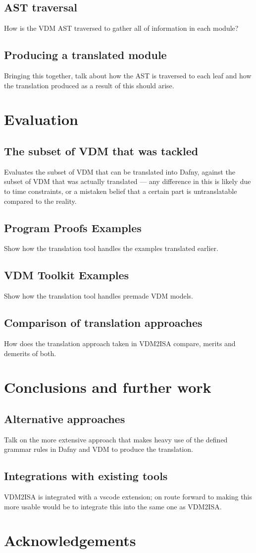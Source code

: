 \documentclass{entcs}
\begin{document}
\subsection{AST traversal}
How is the VDM AST traversed to gather all of information in each module?

\subsection{Producing a translated module}
Bringing this together, talk about how the AST is traversed to each leaf and how the translation produced as a result of this should arise.

\section{Evaluation}
\subsection{The subset of VDM that was tackled}
Evaluates the subset of VDM that can be translated into Dafny, against the subset of VDM that was actually translated --- any difference in this is likely due to time constraints, or a mistaken belief that a certain part is untranslatable compared to the reality.

\subsection{Program Proofs Examples}
Show how the translation tool handles the examples translated earlier.

\subsection{VDM Toolkit Examples}
Show how the translation tool handles premade VDM models.

\subsection{Comparison of translation approaches}
How does the translation approach taken in VDM2ISA compare, merits and demerits of both.

\section{Conclusions and further work}

\subsection{Alternative approaches}
Talk on the more extensive approach that makes heavy use of the defined grammar rules in Dafny and VDM to produce the translation.

\subsection{Integrations with existing tools}
VDM2ISA is integrated with a vscode extension; on route forward to making this more usable would be to integrate this into the same one as VDM2ISA.

\section{Acknowledgements}



\end{document}
